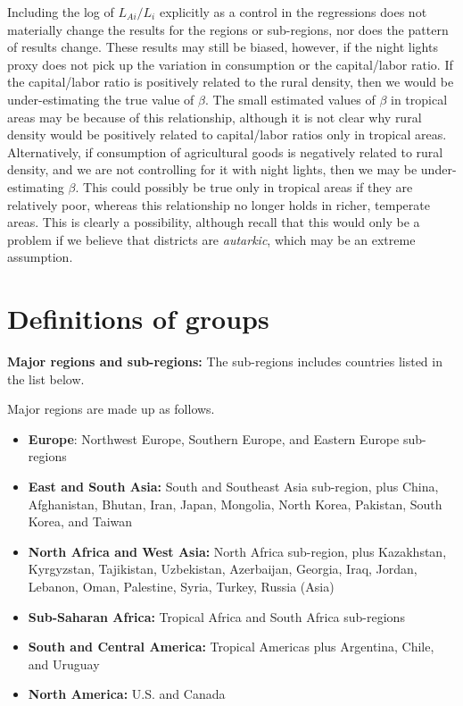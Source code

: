 \documentclass[11pt]{article}
\begin{document}
Including the log of $L_{Ai}/L_i$ explicitly as a control in the regressions does not materially change the results for the regions or sub-regions, nor does the pattern of results change. These results may still be biased, however, if the night lights proxy does not pick up the variation in consumption or the capital/labor ratio. If the capital/labor ratio is positively related to the rural density, then we would be under-estimating the true value of $\beta$. The small estimated values of $\beta$ in tropical areas may be because of this relationship, although it is not clear why rural density would be positively related to capital/labor ratios only in tropical areas. Alternatively, if consumption of agricultural goods is negatively related to rural density, and we are not controlling for it with night lights, then we may be under-estimating $\beta$. This could possibly be true only in tropical areas if they are relatively poor, whereas this relationship no longer holds in richer, temperate areas. This is clearly a possibility, although recall that this would only be a problem if we believe that districts are \textit{autarkic}, which may be an extreme assumption.

\section{Definitions of groups}

\noindent\textbf{Major regions and sub-regions:} The sub-regions includes countries listed in the list below. 
\begin{itemize}
    \setlength\itemsep{0pt}
    
\end{itemize}
Major regions are made up as follows. 
\begin{itemize}
    \setlength\itemsep{0pt}
    \item \textbf{Europe}: Northwest Europe, Southern Europe, and Eastern Europe sub-regions
    \item \textbf{East and South Asia:} South and Southeast Asia sub-region, plus China, Afghanistan, Bhutan, Iran, Japan, Mongolia, North Korea, Pakistan, South Korea, and Taiwan
    \item \textbf{North Africa and West Asia:} North Africa sub-region, plus Kazakhstan, Kyrgyzstan, Tajikistan, Uzbekistan, Azerbaijan, Georgia, Iraq, Jordan, Lebanon, Oman, Palestine, Syria, Turkey, Russia (Asia)
    \item \textbf{Sub-Saharan Africa:} Tropical Africa and South Africa sub-regions
    \item \textbf{South and Central America:} Tropical Americas plus Argentina, Chile, and Uruguay
    \item \textbf{North America:} U.S. and Canada
\end{itemize}
\end{document}
